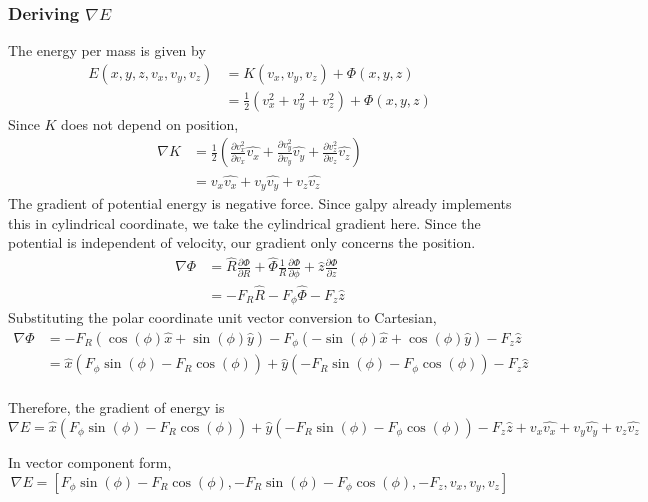 \documentclass[12pt]{article}
\begin{document}
\subsubsection{Deriving $\nabla E$}
The energy per mass is given by 
\begin{align*}
E(x,y,z,v_x,v_y,v_z) &= K(v_x,v_y,v_z) + \Phi(x,y,z) \\
&= \frac{1}{2}(v_x^2 + v_y^2 + v_z^2) + \Phi(x,y,z)
\end{align*}
Since $K$ does not depend on position,
\begin{align*}
\nabla K &= \frac{1}{2}(\frac{\partial v_x^2}{\partial v_x} \hat{v_x} +\frac{\partial v_y^2}{\partial v_y}\hat{v_y} + \frac{\partial v_z^2}{\partial v_z} \hat{v_z}) \\
&= v_x \hat{v_x} + v_y \hat{v_y} + v_z \hat{v_z} 
\end{align*}
The gradient of potential energy is negative force. Since galpy already implements this in cylindrical coordinate, we take the cylindrical gradient here. Since the potential is independent of velocity, our gradient only concerns the position.
\begin{align*}
 \nabla \Phi &= \hat{R} \frac{\partial \Phi}{\partial R} + \hat{\Phi} \frac{1}{R}\frac{\partial \Phi}{\partial \phi} + \hat{z}\frac{\partial \Phi}{\partial z} \\
&= - F_R \hat{R}  -F_{\phi} \hat{\Phi} - F_z \hat{z}
\end{align*}
Substituting the polar coordinate unit vector conversion to Cartesian,
\begin{align*}
 \nabla \Phi &= - F_R (\cos(\phi) \hat{x} + \sin(\phi) \hat{y})  -F_{\phi} (- \sin(\phi) \hat{x} + \cos(\phi) \hat{y}) - F_z \hat{z} \\
 &= \hat{x}(F_{\phi} \sin(\phi)- F_R \cos(\phi)) + \hat{y}(- F_R \sin(\phi) -F_{\phi} \cos(\phi)) - F_z \hat{z} \\
\end{align*}

Therefore, the gradient of energy is
$$ \nabla E =  \hat{x}(F_{\phi} \sin(\phi)- F_R \cos(\phi)) + \hat{y}(- F_R \sin(\phi) -F_{\phi} \cos(\phi)) - F_z \hat{z} + v_x \hat{v_x} + v_y \hat{v_y} + v_z \hat{v_z} $$

In vector component form, 
$$ \nabla E = [F_{\phi} \sin(\phi)- F_R \cos(\phi),- F_R \sin(\phi) -F_{\phi} \cos(\phi), - F_z ,v_x, v_y, v_z ] $$
\end{document}
